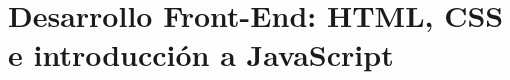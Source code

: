 
\part[Desarrollo FrontEnd]{Desarrollo Front-End: HTML, CSS e introducción a JavaScript} %
\label{prt:desarrollo_ _front_end_}

